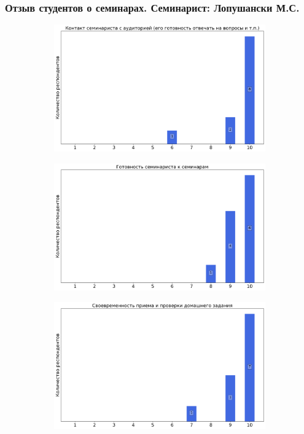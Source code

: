     \subsubsection{Отзыв студентов о семинарах. Семинарист: Лопушански М.С.}
		\begin{figure}[H]
			\centering
			\begin{subfigure}[b]{0.45\textwidth}
				\centering
				\includegraphics[width=\textwidth]{images/3 course/ТФКП/seminarists-marks-Лопушански М.С.-0.png}
			\end{subfigure}
			\begin{subfigure}[b]{0.45\textwidth}
				\centering
				\includegraphics[width=\textwidth]{images/3 course/ТФКП/seminarists-marks-Лопушански М.С.-1.png}
			\end{subfigure}
			\begin{subfigure}[b]{0.45\textwidth}
				\centering
				\includegraphics[width=\textwidth]{images/3 course/ТФКП/seminarists-marks-Лопушански М.С.-2.png}

\end{subfigure}
\end{figure}
